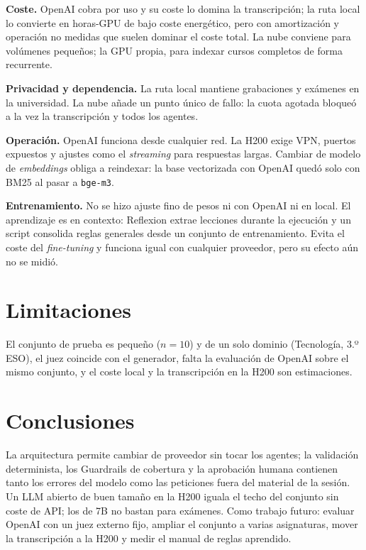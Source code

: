 \documentclass[journal]{IEEEtran}
\begin{document}
\textbf{Coste.} OpenAI cobra por uso y su coste lo domina la transcripción; la ruta local lo
convierte en horas-GPU de bajo coste energético, pero con amortización y operación no
medidas que suelen dominar el coste total. La nube conviene para volúmenes pequeños; la
GPU propia, para indexar cursos completos de forma recurrente.

\textbf{Privacidad y dependencia.} La ruta local mantiene grabaciones y exámenes en la
universidad. La nube añade un punto único de fallo: la cuota agotada bloqueó a la vez la
transcripción y todos los agentes.

\textbf{Operación.} OpenAI funciona desde cualquier red. La H200 exige VPN, puertos
expuestos y ajustes como el \emph{streaming} para respuestas largas. Cambiar de modelo de
\emph{embeddings} obliga a reindexar: la base vectorizada con OpenAI quedó solo con BM25 al
pasar a \texttt{bge-m3}.

\textbf{Entrenamiento.} No se hizo ajuste fino de pesos ni con OpenAI ni en local. El
aprendizaje es en contexto: Reflexion extrae lecciones durante la ejecución y un script
consolida reglas generales desde un conjunto de entrenamiento. Evita el coste del
\emph{fine-tuning} y funciona igual con cualquier proveedor, pero su efecto aún no se midió.

\section{Limitaciones}
El conjunto de prueba es pequeño ($n=10$) y de un solo dominio (Tecnología, 3.º ESO), el
juez coincide con el generador, falta la evaluación de OpenAI sobre el mismo conjunto, y
el coste local y la transcripción en la H200 son estimaciones.

\section{Conclusiones}
La arquitectura permite cambiar de proveedor sin tocar los agentes; la validación
determinista, los Guardrails de cobertura y la aprobación humana contienen tanto los
errores del modelo como las peticiones fuera del material de la sesión. Un LLM abierto de
buen tamaño en la H200 iguala el techo del conjunto sin coste de API; los de 7B no bastan
para exámenes. Como trabajo futuro: evaluar OpenAI con un juez externo fijo, ampliar el
conjunto a varias asignaturas, mover la transcripción a la H200 y medir el manual de
reglas aprendido.
\end{document}
